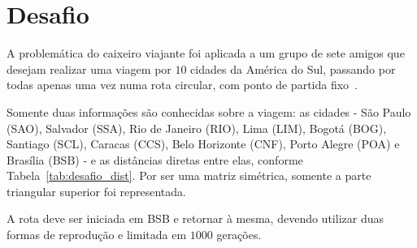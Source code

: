 \section{Desafio}
    \label{sec:desafio}
A problemática do caixeiro viajante foi aplicada a um grupo de sete amigos que desejam realizar uma viagem por $10$ cidades da América do Sul, passando por todas apenas uma vez numa rota circular, com ponto de partida fixo~\cite{Roteiro}.

Somente duas informações são conhecidas sobre a viagem: as cidades - São Paulo (SAO), Salvador (SSA), Rio de Janeiro (RIO), Lima (LIM), Bogotá (BOG), Santiago (SCL), Caracas (CCS), Belo Horizonte (CNF), Porto Alegre (POA) e Brasília (BSB) - e as distâncias diretas entre elas, conforme Tabela~\ref{tab:desafio_dist}. Por ser uma matriz simétrica, somente a parte triangular superior foi representada.

A rota deve ser iniciada em BSB e retornar à mesma, devendo utilizar duas formas de reprodução e limitada em $1000$ gerações.

